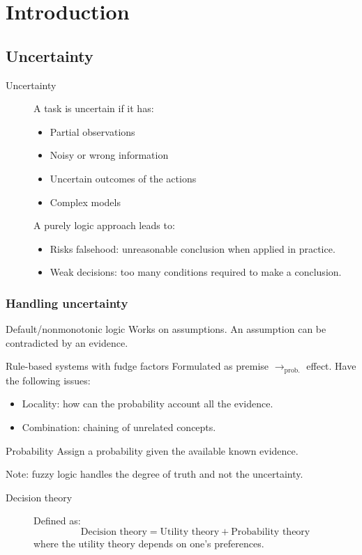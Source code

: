 \chapter{Introduction}


\section{Uncertainty}
\begin{description}
    \item[Uncertainty] 
        A task is uncertain if it has:
        \begin{itemize}
            \item Partial observations
            \item Noisy or wrong information
            \item Uncertain outcomes of the actions
            \item Complex models
        \end{itemize}

        A purely logic approach leads to:
        \begin{itemize}
            \item Risks falsehood: unreasonable conclusion when applied in practice.
            \item Weak decisions: too many conditions required to make a conclusion.
        \end{itemize}
\end{description}


\subsection{Handling uncertainty}
\begin{descriptionlist}
    \item[Default/nonmonotonic logic] 
        Works on assumptions.
        An assumption can be contradicted by an evidence.

    \item[Rule-based systems with fudge factors] 
        Formulated as premise $\rightarrow_\text{prob.}$ effect.
        Have the following issues:
        \begin{itemize}
            \item Locality: how can the probability account all the evidence.
            \item Combination: chaining of unrelated concepts.
        \end{itemize}

    \item[Probability] 
        Assign a probability given the available known evidence.

        Note: fuzzy logic handles the degree of truth and not the uncertainty.
\end{descriptionlist}

\begin{description}
    \item[Decision theory] 
        Defined as:
        \[ \text{Decision theory} = \text{Utility theory} + \text{Probability theory} \]
        where the utility theory depends on one's preferences.
\end{description}